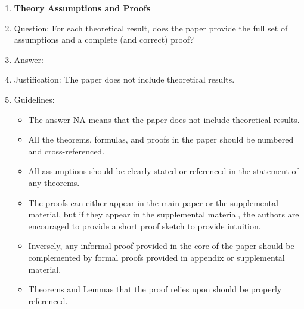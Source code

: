 \documentclass{article}
\begin{document}
\begin{enumerate}
\item {\bf Theory Assumptions and Proofs}
    \item[] Question: For each theoretical result, does the paper provide the full set of assumptions and a complete (and correct) proof?
    \item[] Answer: \answerNA{} %
    \item[] Justification: The paper does not include theoretical results.
    \item[] Guidelines:
    \begin{itemize}
        \item The answer NA means that the paper does not include theoretical results. 
        \item All the theorems, formulas, and proofs in the paper should be numbered and cross-referenced.
        \item All assumptions should be clearly stated or referenced in the statement of any theorems.
        \item The proofs can either appear in the main paper or the supplemental material, but if they appear in the supplemental material, the authors are encouraged to provide a short proof sketch to provide intuition. 
        \item Inversely, any informal proof provided in the core of the paper should be complemented by formal proofs provided in appendix or supplemental material.
        \item Theorems and Lemmas that the proof relies upon should be properly referenced. 
    \end{itemize}


\end{enumerate}
\end{document}
